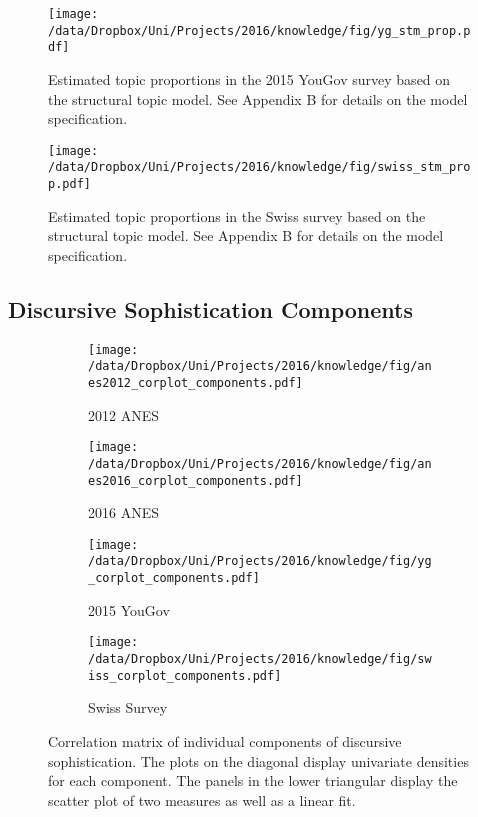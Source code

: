 \begin{figure}[h]\centering
\texttt{[image: /data/Dropbox/Uni/Projects/2016/knowledge/fig/yg\_stm\_prop.pdf]}
\caption{Estimated topic proportions in the 2015 YouGov survey based on the structural topic model. See Appendix B for details on the model specification.}\label{fig:yg_stm_prop}
\end{figure}

\begin{figure}[h]\centering
\texttt{[image: /data/Dropbox/Uni/Projects/2016/knowledge/fig/swiss\_stm\_prop.pdf]}
\caption{Estimated topic proportions in the Swiss survey based on the structural topic model. See Appendix B for details on the model specification.}\label{fig:swiss_stm_prop}
\end{figure}


\clearpage
\subsection{Discursive Sophistication Components}
\begin{figure*}[h]
    \centering
    \begin{subfigure}[h]{0.4\textwidth}
        \centering
        \texttt{[image: /data/Dropbox/Uni/Projects/2016/knowledge/fig/anes2012\_corplot\_components.pdf]}
        \caption{2012 ANES}
    \end{subfigure}%
    \begin{subfigure}[h]{0.4\textwidth}
         \centering
         \texttt{[image: /data/Dropbox/Uni/Projects/2016/knowledge/fig/anes2016\_corplot\_components.pdf]}
         \caption{2016 ANES}
    \end{subfigure}%
    
    \begin{subfigure}[h]{0.4\textwidth}
        \centering
        \texttt{[image: /data/Dropbox/Uni/Projects/2016/knowledge/fig/yg\_corplot\_components.pdf]}
        \caption{2015 YouGov}
    \end{subfigure}%
    \begin{subfigure}[h]{0.4\textwidth}
         \centering
         \texttt{[image: /data/Dropbox/Uni/Projects/2016/knowledge/fig/swiss\_corplot\_components.pdf]}
         \caption{Swiss Survey}
    \end{subfigure}
    \caption{Correlation matrix of individual components of discursive sophistication.
     The plots on the diagonal display univariate densities for each component. The panels in the lower triangular display the scatter plot of two measures as well as a linear fit. %
     }\label{fig:components}
\end{figure*}



